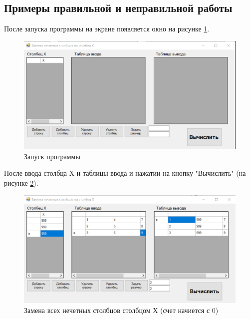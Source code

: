 \subsection{Примеры правильной и неправильной работы}
После запуска программы на экране появляется окно на рисунке \ref{task5_launch1}.
\begin{figure}[H]
    \centering
    \includegraphics[width=1\linewidth]{lections/img/task5_launch1.png}
    \caption{Запуск программы}
    \label{task5_launch1}
\end{figure}

После ввода столбца X и таблицы ввода и нажатии на кнопку "Вычислить" (на рисунке \ref{task5_launch2}).

\begin{figure}[H]
    \centering
    \includegraphics[width=1\linewidth]{lections/img/task5_launch2.png}
    \caption{Замена всех нечетных столбцов столбцом Х (счет начиется с 0)}
    \label{task5_launch2}
\end{figure}


